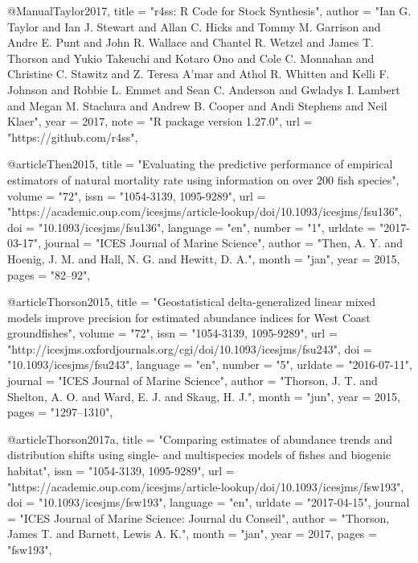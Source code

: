 @Manual{Taylor2017,
    title = "{r4ss: R Code for Stock Synthesis}",
    author = "{Ian G. Taylor and Ian J. Stewart and Allan C. Hicks and Tommy M. Garrison and Andre E. Punt and John R. Wallace and Chantel R. Wetzel and James T. Thorson and Yukio Takeuchi and Kotaro Ono and Cole C. Monnahan and Christine C. Stawitz and Z. Teresa A'mar and Athol R. Whitten and Kelli F. Johnson and Robbie L. Emmet and Sean C. Anderson and Gwladys I. Lambert and Megan M. Stachura and Andrew B. Cooper and Andi Stephens and Neil Klaer}",
    year = 2017,
    note = "{R package version 1.27.0}",
    url = "{https://github.com/r4ss}",
}

@article{Then2015,
    title = "{Evaluating the predictive performance of empirical estimators of natural mortality rate using information on over 200 fish species}",
    volume = "{72}",
    issn = "{1054-3139, 1095-9289}",
    url = "{https://academic.oup.com/icesjms/article-lookup/doi/10.1093/icesjms/fsu136}",
    doi = "{10.1093/icesjms/fsu136}",
    language = "{en}",
    number = "{1}",
    urldate = "{2017-03-17}",
    journal = "{ICES Journal of Marine Science}",
    author = "{Then, A. Y. and Hoenig, J. M. and Hall, N. G. and Hewitt, D. A.}",
    month = "jan",
    year = 2015,
    pages = "{82--92}",
}

@article{Thorson2015,
    title = "{Geostatistical delta-generalized linear mixed models improve precision for estimated abundance indices for {West} {Coast} groundfishes}",
    volume = "{72}",
    issn = "{1054-3139, 1095-9289}",
    url = "{http://icesjms.oxfordjournals.org/cgi/doi/10.1093/icesjms/fsu243}",
    doi = "{10.1093/icesjms/fsu243}",
    language = "{en}",
    number = "{5}",
    urldate = "{2016-07-11}",
    journal = "{ICES Journal of Marine Science}",
    author = "{Thorson, J. T. and Shelton, A. O. and Ward, E. J. and Skaug, H. J.}",
    month = "jun",
    year = 2015,
    pages = "{1297--1310}",
}

@article{Thorson2017a,
    title = "{Comparing estimates of abundance trends and distribution shifts using single- and multispecies models of fishes and biogenic habitat}",
    issn = "{1054-3139, 1095-9289}",
    url = "{https://academic.oup.com/icesjms/article-lookup/doi/10.1093/icesjms/fsw193}",
    doi = "{10.1093/icesjms/fsw193}",
    language = "{en}",
    urldate = "{2017-04-15}",
    journal = "{ICES Journal of Marine Science: Journal du Conseil}",
    author = "{Thorson, James T. and Barnett, Lewis A. K.}",
    month = "jan",
    year = 2017,
    pages = "{fsw193}",
}

